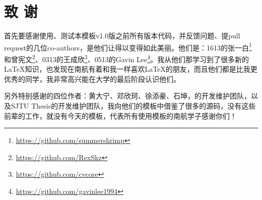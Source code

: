 \chapter{致 \quad 谢}

首先要感谢使用、测试本模板v1.0版之前所有版本代码，并反馈问题、提pull request的几位co-authors，是他们让\nuaathesis 得以变得如此美丽。他们是：1613的张一白\footnote{\url{https://github.com/summershrimp}}和曾宪文\footnote{\url{https://github.com/RexSkz}}、0313的王成欣\footnote{\url{https://github.com/cvcore}}、0513的Gavin Lee\footnote{\url{https://github.com/gavinlee1994}}。我从他们那学习到了很多新的\LaTeX 知识，也发现在南航有着和我一样喜欢\LaTeX 的朋友，而且他们都是比我更优秀的同学，我非常高兴能在大学的最后阶段认识他们。

另外特别感谢\oldnuaathesis 的四位作者：黄大宁、邓欣珂、徐添豪、石坤，\seuthesix 的开发维护团队，以及SJTU Thesis的开发维护团队，我向他们的模板中借鉴了很多的源码，没有这些前辈的工作，就没有今天的\nuaathesis 模板，代表所有使用\nuaathesis 模板的南航学子感谢你们！

